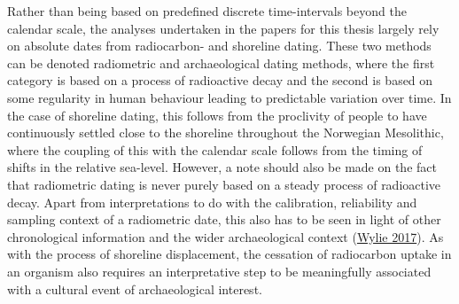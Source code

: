 \documentclass[
  12pt,
  a4paper,
  oneside]{book}
\begin{document}
Rather than being based on predefined discrete time-intervals beyond the calendar scale, the analyses undertaken in the papers for this thesis largely rely on absolute dates from radiocarbon- and shoreline dating. These two methods can be denoted radiometric and archaeological dating methods, where the first category is based on a process of radioactive decay and the second is based on some regularity in human behaviour leading to predictable variation over time. In the case of shoreline dating, this follows from the proclivity of people to have continuously settled close to the shoreline throughout the Norwegian Mesolithic, where the coupling of this with the calendar scale follows from the timing of shifts in the relative sea-level. However, a note should also be made on the fact that radiometric dating is never purely based on a steady process of radioactive decay. Apart from interpretations to do with the calibration, reliability and sampling context of a radiometric date, this also has to be seen in light of other chronological information and the wider archaeological context (\protect\hyperlink{ref-wylie2017}{Wylie 2017}). As with the process of shoreline displacement, the cessation of radiocarbon uptake in an organism also requires an interpretative step to be meaningfully associated with a cultural event of archaeological interest.
\end{document}

